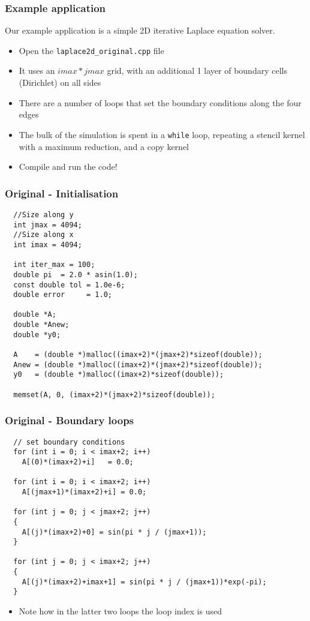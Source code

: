 \documentclass{beamer}
\begin{document}
\begin{frame}
\frametitle{Example application}
Our example application is a simple 2D iterative Laplace equation solver.
\begin{itemize}
\item Open the \texttt{laplace2d\_original.cpp} file
\item It uses an $imax*jmax$ grid, with an additional 1 layer of boundary cells (Dirichlet) on all sides
\item There are a number of loops that set the boundary conditions along the four edges
\item The bulk of the simulation is spent in a \texttt{while} loop, repeating a stencil kernel with a maximum reduction, and a copy kernel
\item Compile and run the code!
\end{itemize}
\end{frame}

\begin{frame}[fragile]
\frametitle{Original - Initialisation}

\begin{lstlisting}
  //Size along y
  int jmax = 4094;
  //Size along x
  int imax = 4094;
  
  int iter_max = 100;
  double pi  = 2.0 * asin(1.0);
  const double tol = 1.0e-6;
  double error     = 1.0;

  double *A;
  double *Anew;
  double *y0;

  A    = (double *)malloc((imax+2)*(jmax+2)*sizeof(double));
  Anew = (double *)malloc((imax+2)*(jmax+2)*sizeof(double));
  y0   = (double *)malloc((imax+2)*sizeof(double));

  memset(A, 0, (imax+2)*(jmax+2)*sizeof(double));\end{lstlisting}

\end{frame}

\begin{frame}[fragile]
\frametitle{Original - Boundary loops}

\begin{lstlisting}
  // set boundary conditions
  for (int i = 0; i < imax+2; i++)
    A[(0)*(imax+2)+i]   = 0.0;

  for (int i = 0; i < imax+2; i++)
    A[(jmax+1)*(imax+2)+i] = 0.0;

  for (int j = 0; j < jmax+2; j++)
  {
    A[(j)*(imax+2)+0] = sin(pi * j / (jmax+1));
  }

  for (int j = 0; j < imax+2; j++)
  {
    A[(j)*(imax+2)+imax+1] = sin(pi * j / (jmax+1))*exp(-pi);
  }
  \end{lstlisting}
\begin{itemize}
\item Note how in the latter two loops the loop index is used
\end{itemize}
\end{frame}
\end{document}
